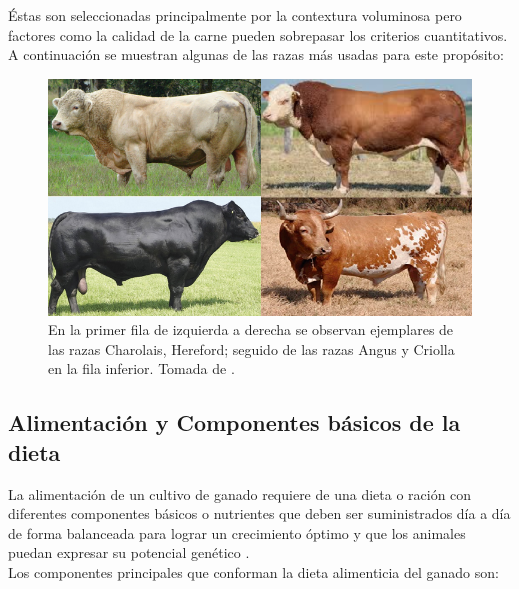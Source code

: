 Éstas son seleccionadas principalmente por la contextura voluminosa pero factores como la calidad de la carne pueden sobrepasar los criterios cuantitativos. A continuación se muestran algunas de las razas más usadas para este propósito:

\begin{figure}[H]
 \begin{center}
 \includegraphics[scale=0.56]{img/cuadrorazas.png}
 \caption{En la primer fila de izquierda a derecha se observan ejemplares de las razas Charolais, Hereford; seguido de las razas Angus y Criolla en la fila inferior.  Tomada de \cite{contextoganadero}. \label{cuadrorazaspng}}
  \end{center}
\end{figure}


\subsection{Alimentación y Componentes básicos de la dieta}
La alimentación de un cultivo de ganado requiere de una dieta o ración con diferentes componentes básicos o nutrientes que deben ser suministrados día a día de forma balanceada para lograr un crecimiento óptimo y que los animales puedan expresar su potencial genético \cite{recomendaciones}.\\

Los componentes principales que conforman la dieta alimenticia  del ganado son:
	


